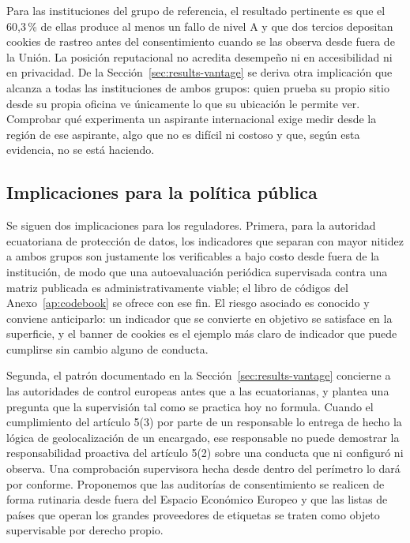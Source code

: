 \documentclass[pdflatex,sn-basic,Numbered]{sn-jnl}
\theoremstyle{thmstyleone}
\theoremstyle{thmstyletwo}
\theoremstyle{thmstylethree}
\begin{document}
Para las instituciones del grupo de referencia, el resultado pertinente es que el 60,3\,\% de ellas produce al menos un fallo de nivel A y que dos tercios depositan cookies de rastreo antes del consentimiento cuando se las observa desde fuera de la Uni\'on. La posici\'on reputacional no acredita desempe\~no ni en accesibilidad ni en privacidad. De la Secci\'on~\ref{sec:results-vantage} se deriva otra implicaci\'on que alcanza a todas las instituciones de ambos grupos: quien prueba su propio sitio desde su propia oficina ve \'unicamente lo que su ubicaci\'on le permite ver. Comprobar qu\'e experimenta un aspirante internacional exige medir desde la regi\'on de ese aspirante, algo que no es dif\'icil ni costoso y que, seg\'un esta evidencia, no se est\'a haciendo.

\subsection{Implicaciones para la pol\'itica p\'ublica}\label{sec:discussion-policy}

Se siguen dos implicaciones para los reguladores. Primera, para la autoridad ecuatoriana de protecci\'on de datos, los indicadores que separan con mayor nitidez a ambos grupos son justamente los verificables a bajo costo desde fuera de la instituci\'on, de modo que una autoevaluaci\'on peri\'odica supervisada contra una matriz publicada es administrativamente viable; el libro de c\'odigos del Anexo~\ref{ap:codebook} se ofrece con ese fin. El riesgo asociado es conocido y conviene anticiparlo: un indicador que se convierte en objetivo se satisface en la superficie, y el banner de cookies es el ejemplo m\'as claro de indicador que puede cumplirse sin cambio alguno de conducta.

Segunda, el patr\'on documentado en la Secci\'on~\ref{sec:results-vantage} concierne a las autoridades de control europeas antes que a las ecuatorianas, y plantea una pregunta que la supervisi\'on tal como se practica hoy no formula. Cuando el cumplimiento del art\'iculo 5(3) por parte de un responsable lo entrega de hecho la l\'ogica de geolocalizaci\'on de un encargado, ese responsable no puede demostrar la responsabilidad proactiva del art\'iculo 5(2) sobre una conducta que ni configur\'o ni observa. Una comprobaci\'on supervisora hecha desde dentro del per\'imetro lo dar\'a por conforme. Proponemos que las auditor\'ias de consentimiento se realicen de forma rutinaria desde fuera del Espacio Econ\'omico Europeo y que las listas de pa\'ises que operan los grandes proveedores de etiquetas se traten como objeto supervisable por derecho propio.
\end{document}
